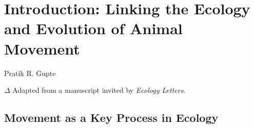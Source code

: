 
{}%
\chapter{Introduction: Linking the Ecology and Evolution of Animal Movement}\label{ch:introduction}

{{Pratik R. Gupte}}

\medskip

{\noindent \large{$\Delta$}} Adapted from a manuscript invited by \textit{Ecology Letters}.

\medskip



\section*{Movement as a Key Process in Ecology}

